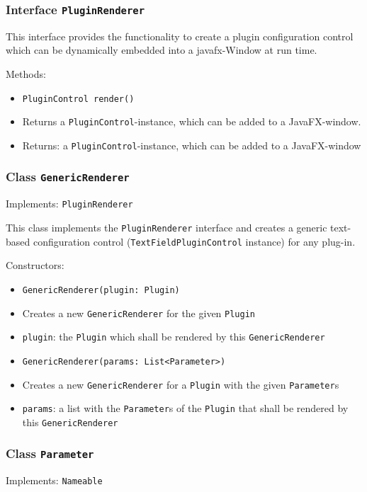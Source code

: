 \documentclass[parskip=full,11pt]{scrartcl}
\begin{document}
\subsubsection{Interface \texttt{PluginRenderer}}

This interface provides the functionality to create a plugin configuration control which can be dynamically embedded into a javafx-Window at run time.

Methods:

\begin{itemize}\itemsep -10pt
	\item \texttt{PluginControl render()}
	\item[] Returns a \texttt{PluginControl}-instance, which can be added to a JavaFX-window.
	\item[] Returns: a \texttt{PluginControl}-instance, which can be added to a JavaFX-window
\end{itemize}

\subsubsection{Class \texttt{GenericRenderer}}
Implements: \texttt{PluginRenderer}
 
This class implements the \texttt{PluginRenderer} interface and creates a generic text-based configuration control (\texttt{TextFieldPluginControl} instance) for any plug-in.

Constructors:

\begin{itemize}\itemsep -10pt
	\item \texttt{GenericRenderer(plugin: Plugin)}
	\item[] Creates a new \texttt{GenericRenderer} for the given \texttt{Plugin}
	\item[] \texttt{plugin}: the \texttt{Plugin} which shall be rendered by this \texttt{GenericRenderer}
	
	\item \texttt{GenericRenderer(params: List<Parameter>)}
	\item[] Creates a new \texttt{GenericRenderer} for a \texttt{Plugin} with the given \texttt{Parameter}s
	\item[] \texttt{params}: a list with the \texttt{Parameter}s of the \texttt{Plugin} that shall be rendered by this \texttt{GenericRenderer}
\end{itemize} 

\subsubsection{Class \texttt{Parameter}}
Implements: \texttt{Nameable}
 
\end{document}

